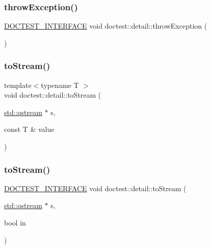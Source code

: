 \subsubsection{\texorpdfstring{throw\+Exception()}{throwException()}}
{\footnotesize\ttfamily \mbox{\hyperlink{doctest_8h_a9c16ffc635ec47f07797d21ede26b1a5}{D\+O\+C\+T\+E\+S\+T\+\_\+\+I\+N\+T\+E\+R\+F\+A\+CE}} void doctest\+::detail\+::throw\+Exception (\begin{DoxyParamCaption}{ }\end{DoxyParamCaption})}

\mbox{\label{namespacedoctest_1_1detail_a71b40611173c82709726b36715229179}} 
\subsubsection{\texorpdfstring{to\+Stream()}{toStream()}\hspace{0.1cm}{\footnotesize\ttfamily [1/16]}}
{\footnotesize\ttfamily template$<$typename T $>$ \\
void doctest\+::detail\+::to\+Stream (\begin{DoxyParamCaption}\item[{\mbox{\hyperlink{doctest_8h_a116af65cb5e924b33ad9d9ecd7a783f3}{std\+::ostream}} $\ast$}]{s,  }\item[{const T \&}]{value }\end{DoxyParamCaption})}

\mbox{\label{namespacedoctest_1_1detail_a54f817dd0c3e33a4f96de3e638d4c559}} 
\subsubsection{\texorpdfstring{to\+Stream()}{toStream()}\hspace{0.1cm}{\footnotesize\ttfamily [2/16]}}
{\footnotesize\ttfamily \mbox{\hyperlink{doctest_8h_a9c16ffc635ec47f07797d21ede26b1a5}{D\+O\+C\+T\+E\+S\+T\+\_\+\+I\+N\+T\+E\+R\+F\+A\+CE}} void doctest\+::detail\+::to\+Stream (\begin{DoxyParamCaption}\item[{\mbox{\hyperlink{doctest_8h_a116af65cb5e924b33ad9d9ecd7a783f3}{std\+::ostream}} $\ast$}]{s,  }\item[{bool}]{in }\end{DoxyParamCaption})}

